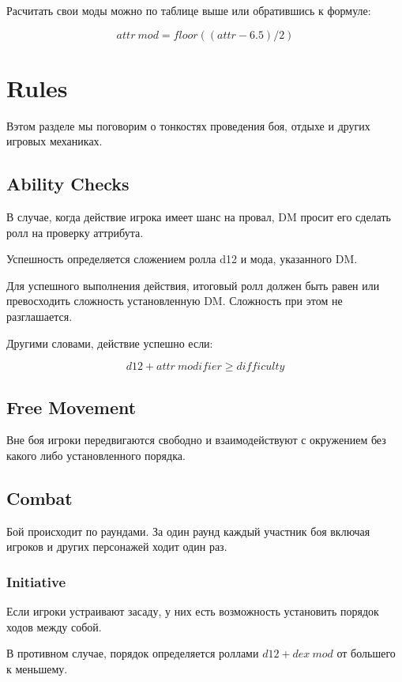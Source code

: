 \documentclass[a4paper,12pt,twocolumn]{book}
\begin{document}
Расчитать свои моды можно по таблице выше или обратившись к формуле:

\[attr\ mod = floor((attr - 6.5)/2)\]

\chapter{Rules}

\lettrine{В}{}этом разделе мы поговорим о тонкостях проведения боя, отдыхе и других игровых механиках.

\section{Ability Checks}

В случае, когда действие игрока имеет шанс на провал, DM просит его сделать ролл на проверку аттрибута.

Успешность определяется сложением ролла d12 и мода, указанного DM.

Для успешного выполнения действия, итоговый ролл должен быть равен или превосходить сложность установленную DM. Сложность при этом не разглашается.

Другими словами, действие успешно если:

\[d12 + attr\ modifier \geq difficulty \]

\section{Free Movement}

Вне боя игроки передвигаются свободно и взаимодействуют с окружением без какого либо установленного порядка.

\section{Combat}

Бой происходит по раундами. За один раунд каждый участник боя включая игроков и других персонажей ходит один раз.

\subsection{Initiative}

Если игроки устраивают засаду, у них есть возможность установить порядок ходов между собой.

В противном случае, порядок определяется роллами \(d12 + dex\ mod\) от большего к меньшему.
\end{document}
